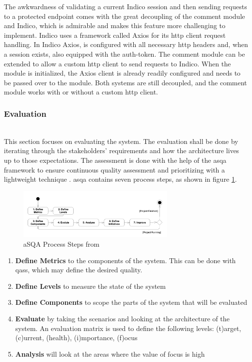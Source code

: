 The awkwardness of validating a current Indico session and then sending requests to a protected endpoint comes with the great decoupling of the comment module and Indico, which is admirable and makes this feature more challenging to implement. Indico uses a framework called Axios \cite{axios} for its \gls{http} client request handling. In Indico Axios, is configured with all necessary \gls{http} headers and, when a session exists, also equipped with the auth-token. The comment module can be extended to allow a custom \gls{http} client to send requests to Indico. When the module is initialized, the Axios client is already readily configured and needs to be passed over to the module. Both systems are still decoupled, and the comment module works with or without a custom \gls{http} client.
\vspace{0.5cm}
\subsubsection{Evaluation}\label{section:poc1-evaluation}\mbox{}\\

This section focuses on evaluating the system. The evaluation shall be done by iterating through the stakeholders' requirements and how the architecture lives up to those expectations. The assessment is done with the help of the \gls{asqa} framework to ensure continuous quality assessment and prioritizing with a lightweight technique \cite{asqa-paper}. \gls{asqa} contains seven process steps, as shown in figure \ref{fig:asqa-process-steps}.

\begin{figure}[!ht]
    \centering
    \includegraphics[width=0.7\textwidth]{thesis/latex/assets/asqa-process-steps.png}
    \caption{aSQA Process Steps from \cite{asqa-paper}}
    \label{fig:asqa-process-steps}
\end{figure}

\begin{enumerate}
    \item \textbf{Define Metrics} to the components of the system. This can be done with \glspl{qas}, which may define the desired quality.
    \item \textbf{Define Levels} to measure the state of the system
    \item \textbf{Define Components} to scope the parts of the system that will be evaluated
    \item \textbf{Evaluate} by taking the scenarios and looking at the architecture of the system. An evaluation matrix is used to define the following levels: (t)arget, (c)urrent, (health), (i)mportance, (f)ocus
    \item \textbf{Analysis} will look at the areas where the value of focus is high
\end{enumerate}

